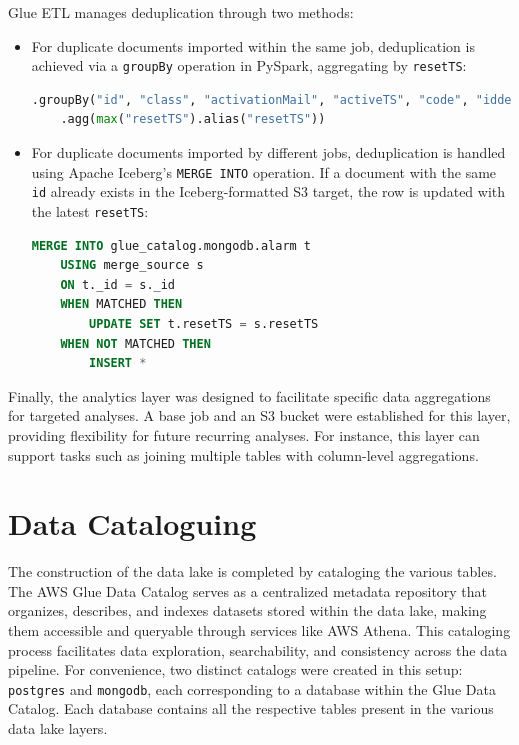 Glue ETL manages deduplication through two methods:
\begin{itemize}
    \item For duplicate documents imported within the same job, deduplication is achieved via a \texttt{groupBy} operation in PySpark, aggregating by \texttt{resetTS}:
    \begin{lstlisting}[language=python]
    .groupBy("id", "class", "activationMail", "activeTS", "code", "iddevice", "resetMail", "payload")
    .agg(max("resetTS").alias("resetTS"))
    \end{lstlisting}
    
    \item For duplicate documents imported by different jobs, deduplication is handled using Apache Iceberg's \texttt{MERGE INTO} operation. If a document with the same \texttt{id} already exists in the Iceberg-formatted S3 target, the row is updated with the latest \texttt{resetTS}:
    \begin{lstlisting}[language=sql]
    MERGE INTO glue_catalog.mongodb.alarm t
    USING merge_source s
    ON t._id = s._id
    WHEN MATCHED THEN
        UPDATE SET t.resetTS = s.resetTS
    WHEN NOT MATCHED THEN
        INSERT *
    \end{lstlisting}
\end{itemize}

Finally, the analytics layer was designed to facilitate specific data aggregations for targeted analyses. A base job and an S3 bucket were established for this layer, providing flexibility for future recurring analyses. For instance, this layer can support tasks such as joining multiple tables with column-level aggregations.

\section{Data Cataloguing}
The construction of the data lake is completed by cataloging the various tables. The AWS Glue Data Catalog serves as a centralized metadata repository that organizes, describes, and indexes datasets stored within the data lake, making them accessible and queryable through services like AWS Athena. This cataloging process facilitates data exploration, searchability, and consistency across the data pipeline. For convenience, two distinct catalogs were created in this setup: \texttt{postgres} and \texttt{mongodb}, each corresponding to a database within the Glue Data Catalog. Each database contains all the respective tables present in the various data lake layers.

